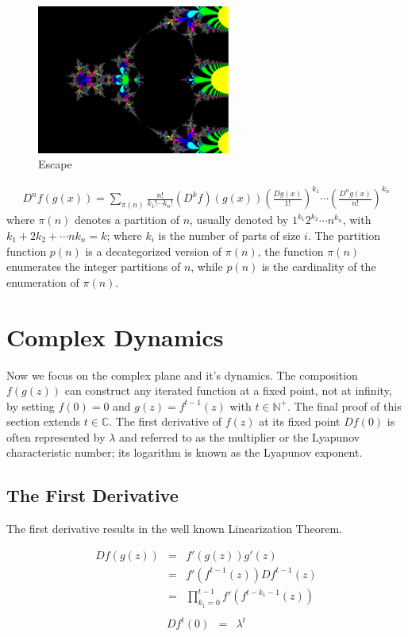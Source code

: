 \documentclass{article}
\theoremstyle{definition}
\begin{document}
\begin{figure}
    \centering
    \includegraphics[width=2.5in]{Escape.eps}
    \caption{Escape}
    \label{fig:Escape}
\end{figure}

\begin{eqnarray}
D^nf(g(x)) = \sum_{\pi(n)} \frac{n!}{k_1! \cdots k_n!} 
(D^kf)(g(x))
\left(\frac{Dg(x)}{1!}\right)^{k_1} \cdots
\left(\frac{D^ng(x)}{n!}\right)^{k_n}
\label{eq:FaaDiBruno}
\end{eqnarray}
where $\pi(n)$ denotes a partition of $n$, usually denoted by $1^{k_1}2^{k_2}\cdots n^{k_n}$, with $k_1+2k_2+ \cdots nk_n=k$; where $k_i$ is the number of parts of size $i$. The partition function $p(n)$ is a decategorized version of $\pi(n)$, the function $\pi(n)$ enumerates the integer partitions of $n$, while $p(n)$ is the cardinality of the enumeration of $\pi(n)$. \cite{Comtet} \cite{Riordan}

\section{Complex Dynamics}

Now we focus on the complex plane and it's dynamics. The composition $f(g(z))$ can construct any iterated function at a fixed point, not at infinity, by setting $f(0)=0$ and $g(z)=f^{t-1}(z)$ with $t \in \mathbb{N^+}$. The final proof of this section extends $t \in \mathbb{C}$. The first derivative of $f(z)$ at its fixed point $Df(0)$ is often represented by $\lambda$ and referred to as the multiplier or the Lyapunov characteristic number; its logarithm is known as the Lyapunov exponent. 

\subsection{The First Derivative}

The first derivative results in the well known Linearization Theorem.

  \begin{eqnarray*}
  Df(g(z))&=&f'(g(z))g'(z)\\
  &=&f'(f^{t-1}(z))Df^{t-1}(z)\\
  &=&\prod^{t-1}_{k_1=0}f'(f^{t-k_1-1}(z))\\
  \end{eqnarray*} 
  \begin{eqnarray}           
  Df^t(0)&=&\lambda^t
  \label{eq:TheFirstDerivative}
  \end{eqnarray}
\end{document}
